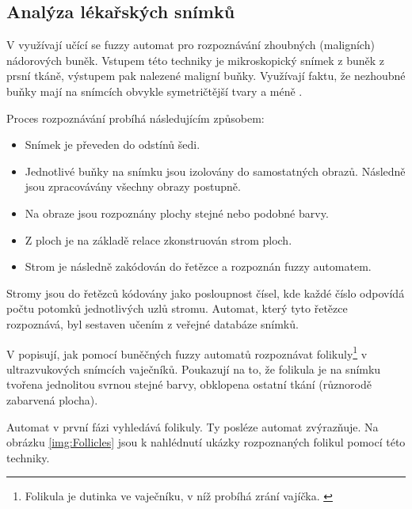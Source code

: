 \documentclass[a4paper,10pt]{article}
\begin{document}
\subsection{Analýza lékařských snímků} \label{subs:MedImgs}
V \cite{Est+-CytImAnaGenFuFiStMa} využívají učící se fuzzy automat pro rozpoznávání zhoubných (maligních) nádorových buněk. Vstupem této techniky je mikroskopický snímek z buněk z prsní tkáně, výstupem pak nalezené maligní buňky. Využívají faktu, že nezhoubné buňky mají na snímcích obvykle symetričtější tvary a méně .

Proces rozpoznávání probíhá následujícím způsobem:
\begin{itemize}
 \item Snímek je převeden do odstínů šedi.
 \item Jednotlivé buňky na snímku jsou izolovány do samostatných obrazů. Následně jsou zpracovávány všechny obrazy postupně.
 \item Na obraze jsou rozpoznány plochy stejné nebo podobné barvy.
 \item Z ploch je na základě relace  zkonstruován strom ploch.
 \item Strom je následně zakódován do řetězce a rozpoznán fuzzy automatem.
\end{itemize}

Stromy jsou do řetězců kódovány jako posloupnost čísel, kde každé číslo odpovídá počtu potomků jednotlivých uzlů stromu. Automat, který tyto řetězce rozpoznává, byl sestaven učením z veřejné databáze snímků.

V \cite{WanJiaZhoDu-ImProcBasFuzCelAuMod} popisují, jak pomocí buněčných fuzzy automatů rozpoznávat folikuly\footnote{Folikula je dutinka ve vaječníku, v níž probíhá zrání vajíčka. \cite{web-Folikul}} v ultrazvukových snímcích vaječníků. Poukazují na to, že folikula je na snímku tvořena jednolitou svrnou stejné barvy, obklopena ostatní tkání (různorodě zabarvená plocha).

Automat v první fázi vyhledává folikuly. Ty posléze automat zvýrazňuje. Na obrázku \ref{img:Follicles} jsou k nahlédnutí ukázky rozpoznaných folikul pomocí této techniky.
\end{document}
